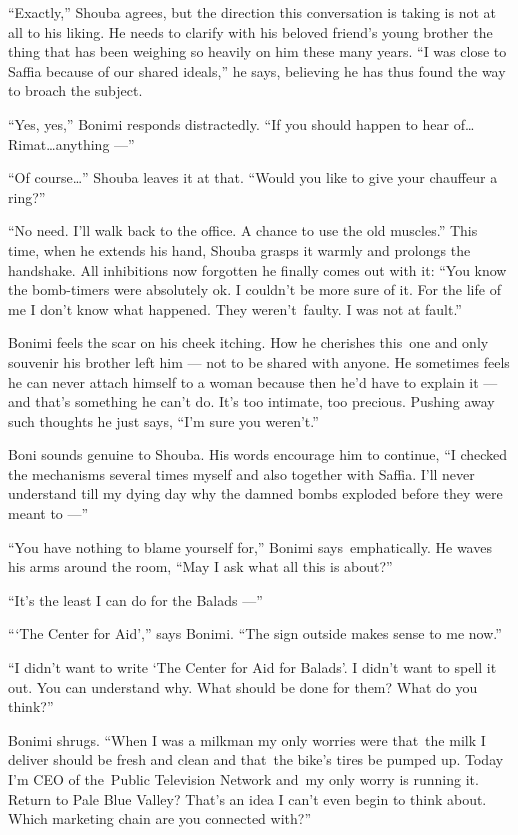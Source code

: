 \documentclass[twoside,11pt,openany]{book}
\begin{document}
``Exactly,'' Shouba agrees, but the direction this conversation is taking is not at all to his
liking. He needs to clarify with his beloved friend's young brother the thing that has been weighing so heavily on him
these many years. ``I was close to Saffia because of our shared ideals,'' he says, believing
he has thus found the way to broach the subject.

``Yes, yes,'' Bonimi responds distractedly. ``If you should happen to hear
of{\ldots}Rimat{\ldots}anything ---''

``Of course{{\ldots}}'' Shouba leaves it at that.
``Would you like to give your chauffeur a ring?''

``No need. I'll walk back to the office.  A chance to use the old muscles.'' This time, when
he extends his hand, Shouba grasps it warmly and prolongs the handshake. All inhibitions now forgotten he finally comes
out with it: ``You know the bomb-timers were absolutely ok. I couldn't be more sure of it. For the life of
me I don't know what happened. They weren't~faulty. I was not at fault.''

Bonimi feels the scar on his cheek itching. How he cherishes this~one and only souvenir his brother left him --- not to be
shared with anyone. He sometimes feels he can never attach himself to a woman because then he'd have to explain it ---
and that's something he can't do. It's too intimate, too precious. Pushing away such thoughts he just says,
``I'm sure you weren't.''

Boni sounds genuine to Shouba. His words encourage him to continue, ``I checked the mechanisms several
times myself and also together with Saffia. I'll never understand till my dying
day{ }why the damned{ }bombs exploded
before they were meant to ---''

``You have nothing to blame yourself for,'' Bonimi says~emphatically. He waves his arms around
the room, ``May I ask what all this is about?''

``It's the least I can do for the Balads ---''

``{\thinspace}`The Center for Aid','' says Bonimi. ``The sign outside makes sense to me now.''

``I didn't want to write `The Center for Aid for Balads'. I didn't want to spell it out. You can understand
why. What should be done for them? What do you think?''

Bonimi shrugs. ``When I was a milkman my only worries were that~the milk I deliver should be fresh and
clean and that~the bike's tires be pumped up. Today I'm CEO of the~Public Television Network and~my only worry is
running it.~ Return to Pale Blue Valley? That's an idea I can't even begin to think about. Which marketing chain are
you connected with?''
\end{document}
